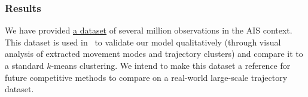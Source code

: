 \subsubsection{Results}

We have provided \href{https://github.com/rtavenar/ushant_ais}{a dataset} of
several
million observations in the AIS context.
This dataset is used in~\cite{gloaguen2020} to validate our model qualitatively
(through visual
analysis of extracted movement modes and trajectory clusters) and compare it to
a standard $k$-means clustering.
We intend to make this dataset a reference for future competitive methods to
compare on a
real-world large-scale trajectory dataset.
